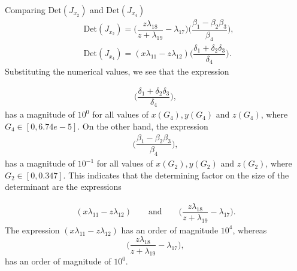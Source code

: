 \documentclass{svjour3}
\begin{document}
Comparing $\text{Det}(J_{x_2})$ and $\text{Det}(J_{x_4})$
{\footnotesize
\begin{align*}
&\text{Det}(J_{x_2})=\Big(\dfrac{z \lambda_{18}}{z+\lambda_{19}} - \lambda_{17} \Big) \Bigg(\dfrac{\beta_1-\beta_2 \beta_3}{\beta_4}\Bigg),\\
& \text{Det}(J_{x_4})=(x \lambda_{11}- z\lambda_{12})\Bigg(\dfrac{\delta_1+\delta_2 \delta_3}{\delta_4}\Bigg).
\end{align*}
}
Substituting the numerical values, we see that the expression\par
{\footnotesize
\begin{align*}
\Bigg(\dfrac{\delta_1+\delta_2 \delta_3}{\delta_4}\Bigg),
\end{align*}
}
has a magnitude of $10^0$ for all values of $x(G_4), y(G_4) $ and $z(G_4)$, where $G_4 \in [0, 6.74e-5]$. On the other hand, the expression
{\footnotesize
\begin{align*}
\Bigg(\dfrac{\beta_1-\beta_2 \beta_3}{\beta_4}\Bigg),
\end{align*}
}
has a magnitude of $10^{-1}$ for all values of $x(G_2), y(G_2) $ and $z(G_2)$, where $G_2 \in [0, 0.347]$. This indicates that the determining factor on the size of the determinant are the expressions\par
{\footnotesize
\begin{align*}
(x \lambda_{11}- z\lambda_{12}) \qquad \text{and} \qquad \Big(\dfrac{z \lambda_{18}}{z+\lambda_{19}} - \lambda_{17} \Big). 
\end{align*}
}
The expression $(x \lambda_{11}- z\lambda_{12})$ has an order of magnitude $10^{4}$, whereas $$\Big(\dfrac{z \lambda_{18}}{z+\lambda_{19}} - \lambda_{17} \Big),$$ has an order of magnitude of $10^0$.\par
\end{document}

